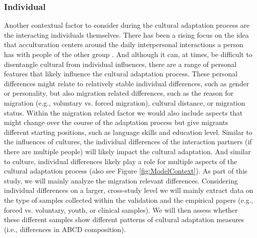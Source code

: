 \documentclass[man, 12pt, a4paper]{apa7}
\begin{document}
\subsubsection{Individual} 
Another contextual factor to consider during the cultural adaptation process are the interacting individuals themselves. There has been a rising focus on the idea that acculturation centers around the daily interpersonal interactions a person has with people of the other group \citep{Maxwell2017, Sam2010}. And although it can, at times, be difficult to disentangle cultural from individual influences, there are a range of personal features that likely influence the cultural adaptation process. These personal differences might relate to relatively stable individual differences, such as gender or personality, but also migration related differences, such as the reason for migration (e.g., voluntary vs. forced migration), cultural distance, or migration status. Within the migration related factor we would also include aspects that might change over the course of the adaptation process but give migrants different starting positions, such as language skills and education level.
Similar to the influences of cultures, the individual differences of the interaction partners (if there are multiple people) will likely impact the cultural adaptation. And similar to culture, individual differences likely play a role for multiple aspects of the cultural adaptation process (also see Figure \ref{fig:ModelContext}). As part of this study, we will mainly analyze the migration relevant differences. Considering individual differences on a larger, cross-study level we will mainly extract data on the type of samples collected within the validation and the empirical papers (e.g., forced vs. voluntary, youth, or clinical samples). We will then assess whether these different samples show different patterns of cultural adaptation measures (i.e., differences in ABCD composition).
\end{document}
